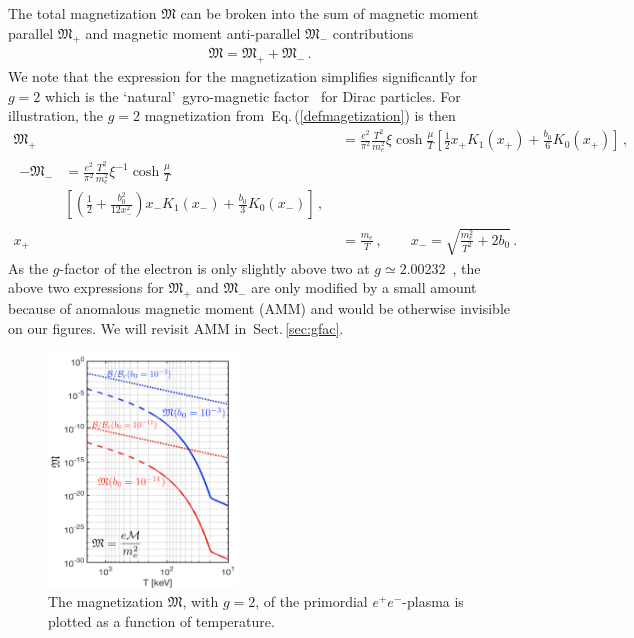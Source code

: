 \documentclass[aps,prd,floatfix,reprint]{revtex4-2}
\newcommand{\req}[1]{Eq.\,(\ref{#1})}
\newcommand{\rsec}[1]{Sect.\,{\ref{#1}}}
\begin{document}
The total magnetization ${\mathfrak M}$ can be broken into the sum of magnetic moment parallel ${\mathfrak M}_{+}$ and magnetic moment anti-parallel ${\mathfrak M}_{-}$ contributions
\begin{align}
\label{g2mag}
{\mathfrak M}={\mathfrak M}_{+}+{\mathfrak M}_{-}\,.
\end{align}
We note that the expression for the magnetization simplifies significantly for $g=2$ which is the \lq natural\rq\ gyro-magnetic factor~\cite{Evans:2022fsu,Rafelski:2022bsv} for Dirac particles. For illustration, the $g=2$ magnetization from~\req{defmagetization} is then
\begin{align}
 \label{g2magplus}
 {\mathfrak M}_{+}&=\frac{e^{2}}{\pi^{2}}\frac{T^{2}}{m_{e}^{2}}\xi\cosh{\frac{\mu}{T}}\left[\frac{1}{2}x_{+}K_{1}(x_{+})+\frac{b_{0}}{6}K_{0}(x_{+})\right]\,,\\
\begin{split} 
 \label{g2magminus}
 -{\mathfrak M}_{-}&=\frac{e^{2}}{\pi^{2}}\frac{T^{2}}{m_{e}^{2}}\xi^{-1}\cosh{\frac{\mu}{T}}\\
 &\left[\left(\frac{1}{2}+\frac{b_{0}^{2}}{12x_{-}^{2}}\right)x_{-}K_{1}(x_{-})+\frac{b_{0}}{3}K_{0}(x_{-})\right]\,,
\end{split}\\
 x_{+}&=\frac{m_{e}}{T}\,,\qquad
 x_{-}=\sqrt{\frac{m_{e}^{2}}{T^{2}}+2b_{0}}\,.
\end{align}
As the $g$-factor of the electron is only slightly above two at $g\simeq2.00232$~\cite{Tiesinga:2021myr}, the above two expressions for ${\mathfrak M}_{+}$ and ${\mathfrak M}_{-}$ are only modified by a small amount because of anomalous magnetic moment (AMM) and would be otherwise invisible on our figures. We will revisit AMM in~\rsec{sec:gfac}.

\begin{figure}[ht]
 \centering
 \includegraphics[width=0.45\textwidth]{plots/Magnetization_Hc_new004.png}
 \caption{The magnetization ${\mathfrak M}$, with $g=2$, of the primordial $e^{+}e^{-}$-plasma is plotted as a function of temperature.}
 \label{fig:magnet} 
\end{figure}
\end{document}
